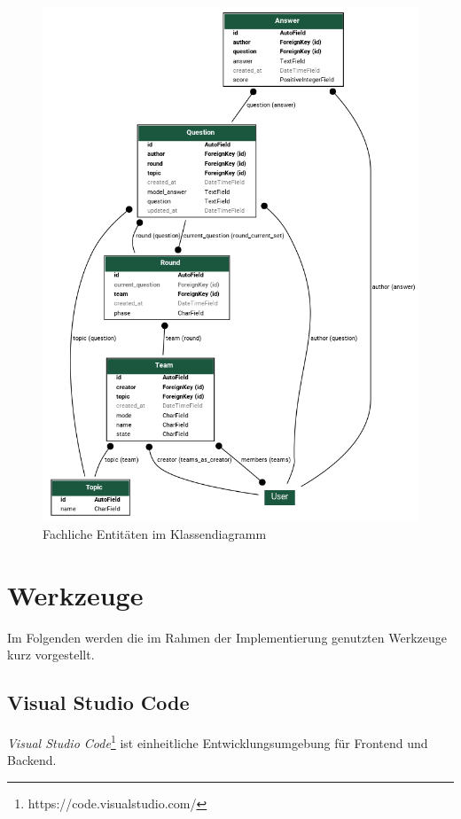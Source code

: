 \documentclass[a4paper,11pt,listof=numbered,glossary=totoc,parskip=half,toc=bib]{scrreprt}
\begin{document}
	\begin{figure}
		\centering
		\includegraphics[width=\textwidth]{models.png}
		\caption{Fachliche Entitäten im Klassendiagramm}
		\label{fig:models}
	\end{figure}
	
	\section{Werkzeuge}
	Im Folgenden werden die im Rahmen der Implementierung genutzten Werkzeuge kurz vorgestellt.
	
	\subsection{Visual Studio Code}
	\textit{Visual Studio Code}\footnote{https://code.visualstudio.com/} ist einheitliche Entwicklungsumgebung für Frontend und Backend.
	
\end{document}
